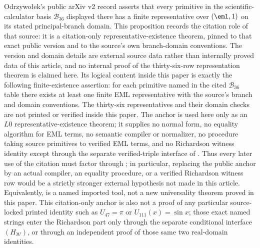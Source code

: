 \begin{proposition}
\label{thm:eml-universality}
Odrzywo{\l}ek's public arXiv v2 record
\cite{Odrzywolek2026SingleBinaryOperator} asserts that every primitive in the
scientific-calculator basis \(\mathcal B_{36}\) displayed there has a finite
representative over \((\eml,1)\) on its stated principal-branch domain.  This
proposition records the citation role of that source: it is a citation-only
representative-existence theorem, pinned to that exact public version and to the
source's own branch-domain conventions.  The
version and domain details are external source data rather than internally proved
data of this article, and no internal proof of the thirty-six-row representation
theorem is claimed here.  Its logical content inside this paper is exactly the
following finite-existence assertion:
for each primitive named in the cited \(\mathcal B_{36}\) table there exists at
least one finite EML representative with the source's branch and domain
conventions.  The thirty-six representatives and their domain checks are not
printed or verified inside this paper.  The anchor is used here only as an
\(L0\) representative-existence theorem; it supplies no normal form, no equality
algorithm for EML terms, no semantic compiler or normalizer, no procedure taking
source primitives to verified EML terms, and no Richardson witness identity
except through the separate verified-triple interface of .
Thus every later use of the citation must factor through
; in particular, replacing the public anchor by
an actual compiler, an equality procedure, or a verified Richardson witness row
would be a strictly stronger external hypothesis not made in this article.
Equivalently,  is a named imported tool, not a new
universality theorem proved in this paper.
This citation-only anchor is also not a proof of any particular source-locked
printed identity such as \(U_{47}=\pi\) or \(U_{111}(x)=\sin x\); those exact
named strings enter the Richardson part only through the separate conditional
interface \((H_{\mathcal W})\), or through an independent proof of those same two
real-domain identities.
\end{proposition}

